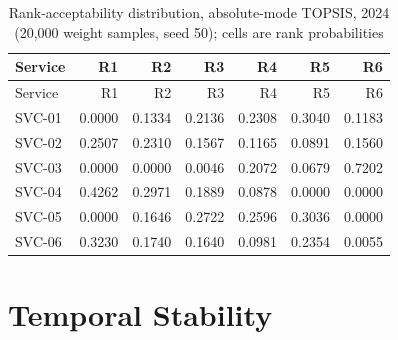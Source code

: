 \documentclass[
  12pt,
  letterpaper,
  12pt,
  oneside,
  english,
  onehalfspacing,
  headsepline]{MastersDoctoralThesis}
\begin{document}
\begin{longtable}[]{@{}lrrrrrr@{}}
\caption{Rank-acceptability distribution, absolute-mode TOPSIS, 2024
(20,000 weight samples, seed 50); cells are rank
probabilities}\label{tbl-appc-montecarlo2024}\tabularnewline
\toprule\noalign{}
Service & R1 & R2 & R3 & R4 & R5 & R6 \\
\midrule\noalign{}
\endfirsthead
\toprule\noalign{}
Service & R1 & R2 & R3 & R4 & R5 & R6 \\
\midrule\noalign{}
\endhead
\bottomrule\noalign{}
\endlastfoot
SVC-01 & 0.0000 & 0.1334 & 0.2136 & 0.2308 & 0.3040 & 0.1183 \\
SVC-02 & 0.2507 & 0.2310 & 0.1567 & 0.1165 & 0.0891 & 0.1560 \\
SVC-03 & 0.0000 & 0.0000 & 0.0046 & 0.2072 & 0.0679 & 0.7202 \\
SVC-04 & 0.4262 & 0.2971 & 0.1889 & 0.0878 & 0.0000 & 0.0000 \\
SVC-05 & 0.0000 & 0.1646 & 0.2722 & 0.2596 & 0.3036 & 0.0000 \\
SVC-06 & 0.3230 & 0.1740 & 0.1640 & 0.0981 & 0.2354 & 0.0055 \\
\end{longtable}

\section{Temporal Stability}\label{temporal-stability}
\end{document}
